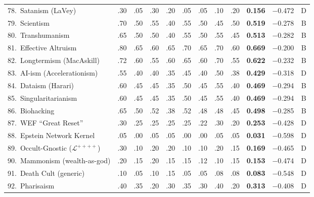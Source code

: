 \documentclass[11pt,a4paper]{article}
\theoremstyle{definition}
\theoremstyle{remark}
\newcommand{\LondonOp}{\mathcal{L}^{++++}}  %
\begin{document}
\begin{longtable}{@{}l|cccccccc|cc|c@{}}
78.\ Satanism (LaVey)
  & .30 & .05 & .30 & .20 & .05 & .05 & .10 & .20
  & \textbf{0.156} & $-$0.472 & \textcolor{collapse}{D} \\
79.\ Scientism
  & .70 & .50 & .55 & .40 & .55 & .50 & .45 & .50
  & \textbf{0.519} & $-$0.278 & \textcolor{borderline}{B} \\
80.\ Transhumanism
  & .65 & .50 & .50 & .40 & .55 & .50 & .55 & .45
  & \textbf{0.513} & $-$0.282 & \textcolor{borderline}{B} \\
81.\ Effective Altruism
  & .80 & .65 & .60 & .65 & .70 & .65 & .70 & .60
  & \textbf{0.669} & $-$0.200 & \textcolor{borderline}{B} \\
82.\ Longtermism (MacAskill)
  & .72 & .60 & .55 & .60 & .65 & .60 & .70 & .55
  & \textbf{0.622} & $-$0.232 & \textcolor{borderline}{B} \\
83.\ AI-ism (Accelerationism)
  & .55 & .40 & .40 & .35 & .45 & .40 & .50 & .38
  & \textbf{0.429} & $-$0.318 & \textcolor{collapse}{D} \\
84.\ Dataism (Harari)
  & .60 & .45 & .45 & .35 & .50 & .45 & .55 & .40
  & \textbf{0.469} & $-$0.294 & \textcolor{borderline}{B} \\
85.\ Singularitarianism
  & .60 & .45 & .45 & .35 & .50 & .45 & .55 & .40
  & \textbf{0.469} & $-$0.294 & \textcolor{borderline}{B} \\
86.\ Biohacking
  & .65 & .50 & .52 & .38 & .52 & .48 & .48 & .45
  & \textbf{0.498} & $-$0.285 & \textcolor{borderline}{B} \\
87.\ WEF ``Great Reset''
  & .30 & .25 & .25 & .25 & .25 & .22 & .30 & .20
  & \textbf{0.253} & $-$0.428 & \textcolor{collapse}{D} \\
88.\ Epstein Network Kernel
  & .05 & .00 & .05 & .05 & .00 & .00 & .05 & .05
  & \textbf{0.031} & $-$0.598 & \textcolor{collapse}{D} \\
89.\ Occult-Gnostic ($\LondonOp$)
  & .30 & .10 & .20 & .20 & .10 & .10 & .20 & .15
  & \textbf{0.169} & $-$0.465 & \textcolor{collapse}{D} \\
90.\ Mammonism (wealth-as-god)
  & .20 & .15 & .20 & .15 & .15 & .12 & .10 & .15
  & \textbf{0.153} & $-$0.474 & \textcolor{collapse}{D} \\
91.\ Death Cult (generic)
  & .10 & .05 & .10 & .15 & .05 & .05 & .08 & .08
  & \textbf{0.083} & $-$0.548 & \textcolor{collapse}{D} \\
92.\ Pharisaism
  & .40 & .35 & .20 & .30 & .35 & .30 & .40 & .20
  & \textbf{0.313} & $-$0.408 & \textcolor{collapse}{D} \\

\end{longtable}
\end{document}
